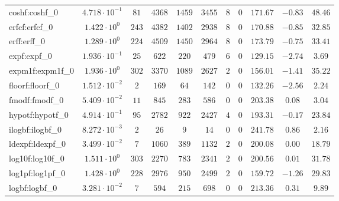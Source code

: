 \begin{tabular}{|l|c|c|c|c|c|c|c|c|c|c|}
coshf:coshf\_0               & $ 4.718 \cdot 10^{-1} $ & $ 81     $ & $ 4368  $ & $ 1459  $ & $ 3455  $ & $ 8   $ & $ 0 $ & $ 171.67      $ & $ -0.83   $ & $ 48.46   $ \\
erfcf:erfcf\_0               & $ 1.422 \cdot 10^{0}  $ & $ 243    $ & $ 4382  $ & $ 1402  $ & $ 2938  $ & $ 8   $ & $ 0 $ & $ 170.88      $ & $ -0.85   $ & $ 32.85   $ \\
erff:erff\_0                 & $ 1.289 \cdot 10^{0}  $ & $ 224    $ & $ 4509  $ & $ 1450  $ & $ 2964  $ & $ 8   $ & $ 0 $ & $ 173.79      $ & $ -0.75   $ & $ 33.41   $ \\
expf:expf\_0                 & $ 1.936 \cdot 10^{-1} $ & $ 25     $ & $ 622   $ & $ 220   $ & $ 479   $ & $ 6   $ & $ 0 $ & $ 129.15      $ & $ -2.74   $ & $ 3.69    $ \\
expm1f:expm1f\_0             & $ 1.936 \cdot 10^{0}  $ & $ 302    $ & $ 3370  $ & $ 1089  $ & $ 2627  $ & $ 2   $ & $ 0 $ & $ 156.01      $ & $ -1.41   $ & $ 35.22   $ \\
floorf:floorf\_0             & $ 1.512 \cdot 10^{-2} $ & $ 2      $ & $ 169   $ & $ 64    $ & $ 142   $ & $ 0   $ & $ 0 $ & $ 132.26      $ & $ -2.56   $ & $ 2.24    $ \\
fmodf:fmodf\_0               & $ 5.409 \cdot 10^{-2} $ & $ 11     $ & $ 845   $ & $ 283   $ & $ 586   $ & $ 0   $ & $ 0 $ & $ 203.38      $ & $ 0.08    $ & $ 3.04    $ \\
hypotf:hypotf\_0             & $ 4.914 \cdot 10^{-1} $ & $ 95     $ & $ 2782  $ & $ 922   $ & $ 2427  $ & $ 4   $ & $ 0 $ & $ 193.31      $ & $ -0.17   $ & $ 23.84   $ \\
ilogbf:ilogbf\_0             & $ 8.272 \cdot 10^{-3} $ & $ 2      $ & $ 26    $ & $ 9     $ & $ 14    $ & $ 0   $ & $ 0 $ & $ 241.78      $ & $ 0.86    $ & $ 2.16    $ \\
ldexpf:ldexpf\_0             & $ 3.499 \cdot 10^{-2} $ & $ 7      $ & $ 1060  $ & $ 389   $ & $ 1132  $ & $ 2   $ & $ 0 $ & $ 200.08      $ & $ 0.00    $ & $ 18.79   $ \\
log10f:log10f\_0             & $ 1.511 \cdot 10^{0}  $ & $ 303    $ & $ 2270  $ & $ 783   $ & $ 2341  $ & $ 2   $ & $ 0 $ & $ 200.56      $ & $ 0.01    $ & $ 31.78   $ \\
log1pf:log1pf\_0             & $ 1.428 \cdot 10^{0}  $ & $ 228    $ & $ 2976  $ & $ 950   $ & $ 2499  $ & $ 2   $ & $ 0 $ & $ 159.72      $ & $ -1.26   $ & $ 29.83   $ \\
logbf:logbf\_0               & $ 3.281 \cdot 10^{-2} $ & $ 7      $ & $ 594   $ & $ 215   $ & $ 698   $ & $ 0   $ & $ 0 $ & $ 213.36      $ & $ 0.31    $ & $ 9.89    $ \\

\end{tabular}

